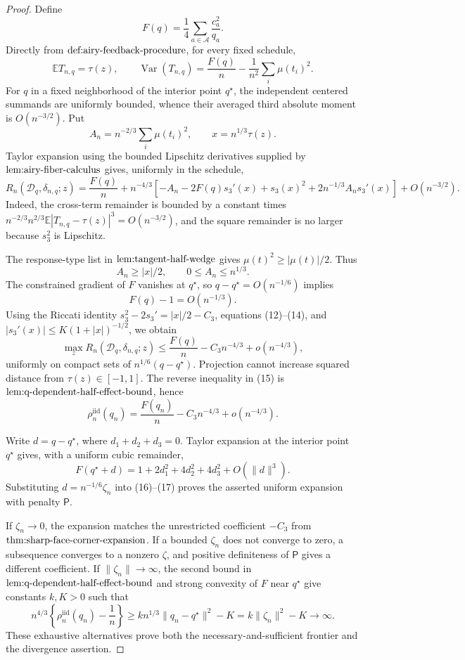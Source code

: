 \documentclass{article}
\begin{document}
\begin{proof}
Define
\[
F(q)=\frac14\sum_{a\in\mathcal A}\frac{c_a^2}{q_a}.
\]
Directly from \(\textnormal{def:airy-feedback-procedure}\), for every fixed schedule,
\[
\mathbb ET_{n,q}=\tau(z),
\qquad
\operatorname{Var}(T_{n,q})
=\frac{F(q)}n-\frac1{n^2}\sum_i\mu(t_i)^2.
\tag{11}
\]
For \(q\) in a fixed neighborhood of the interior point \(q^\star\), the independent centered summands are uniformly bounded, whence their averaged third absolute moment is \(O(n^{-3/2})\).  Put
\[
A_n=n^{-2/3}\sum_i\mu(t_i)^2,
\qquad x=n^{1/3}\tau(z).
\]
Taylor expansion using the bounded Lipschitz derivatives supplied by \(\textnormal{lem:airy-fiber-calculus}\) gives, uniformly in the schedule,
\[
R_n(\mathcal D_q,\delta_{n,q};z)
=\frac{F(q)}n+n^{-4/3}
\left[-A_n-2F(q)s_3'(x)+s_3(x)^2
+2n^{-1/3}A_ns_3'(x)\right]+O(n^{-3/2}).
\tag{12}
\]
Indeed, the cross-term remainder is bounded by a constant times \(n^{-2/3}n^{2/3}\mathbb E|T_{n,q}-\tau(z)|^3=O(n^{-3/2})\), and the square remainder is no larger because \(s_3^2\) is Lipschitz.

The response-type list in \(\textnormal{lem:tangent-half-wedge}\) gives \(\mu(t)^2\geq|\mu(t)|/2\).  Thus
\[
A_n\geq |x|/2,
\qquad 0\leq A_n\leq n^{1/3}.
\tag{13}
\]
The constrained gradient of \(F\) vanishes at \(q^\star\), so \(q-q^\star=O(n^{-1/6})\) implies
\[
F(q)-1=O(n^{-1/3}).
\tag{14}
\]
Using the Riccati identity \(s_3^2-2s_3'=|x|/2-C_3\), equations (12)--(14), and \(|s_3'(x)|\leq K(1+|x|)^{-1/2}\), we obtain
\[
\max_zR_n(\mathcal D_q,\delta_{n,q};z)
\leq\frac{F(q)}n-C_3n^{-4/3}+o(n^{-4/3}),
\tag{15}
\]
uniformly on compact sets of \(n^{1/6}(q-q^\star)\).  Projection cannot increase squared distance from \(\tau(z)\in[-1,1]\).  The reverse inequality in (15) is \(\textnormal{lem:q-dependent-half-effect-bound}\), hence
\[
\rho_n^{\mathrm{iid}}(q_n)
=\frac{F(q_n)}n-C_3n^{-4/3}+o(n^{-4/3}).
\tag{16}
\]

Write \(d=q-q^\star\), where \(d_1+d_2+d_3=0\).  Taylor expansion at the interior point \(q^\star\) gives, with a uniform cubic remainder,
\[
F(q^\star+d)
=1+2d_1^2+4d_2^2+4d_3^2+O(\|d\|^3).
\tag{17}
\]
Substituting \(d=n^{-1/6}\zeta_n\) into (16)--(17) proves the asserted uniform expansion with penalty \(\mathsf P\).

If \(\zeta_n\to0\), the expansion matches the unrestricted coefficient \(-C_3\) from \(\textnormal{thm:sharp-face-corner-expansion}\).  If a bounded \(\zeta_n\) does not converge to zero, a subsequence converges to a nonzero \(\zeta\), and positive definiteness of \(\mathsf P\) gives a different coefficient.  If \(\|\zeta_n\|\to\infty\), the second bound in \(\textnormal{lem:q-dependent-half-effect-bound}\) and strong convexity of \(F\) near \(q^\star\) give constants \(k,K>0\) such that
\[
n^{4/3}\left\{\rho_n^{\mathrm{iid}}(q_n)-\frac1n\right\}
\geq k n^{1/3}\|q_n-q^\star\|^2-K
=k\|\zeta_n\|^2-K\longrightarrow\infty.
\]
These exhaustive alternatives prove both the necessary-and-sufficient frontier and the divergence assertion.
\end{proof}
\end{document}
